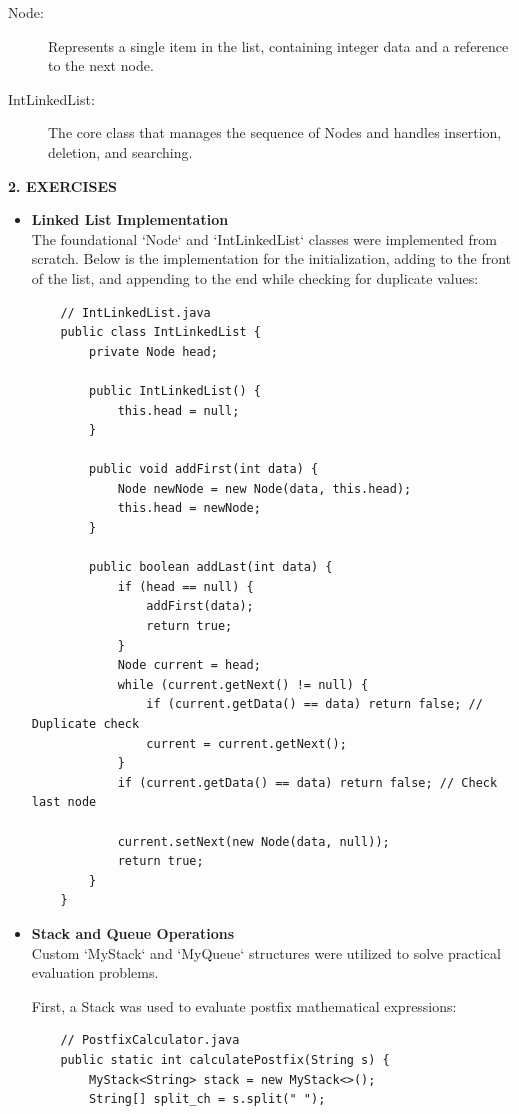 \documentclass[12pt]{article}
\begin{document}
\begin{description}
    \item[Node:] Represents a single item in the list, containing integer data and a reference to the next node.
    \item[IntLinkedList:] The core class that manages the sequence of Nodes and handles insertion, deletion, and searching.
\end{description}


\textbf{2. EXERCISES}
\begin{itemize}

\item[\textbf{Exercise 1. }] \textbf{Linked List Implementation} \\
The foundational `Node` and `IntLinkedList` classes were implemented from scratch. Below is the implementation for the initialization, adding to the front of the list, and appending to the end while checking for duplicate values:
\begin{verbatim}
    // IntLinkedList.java
    public class IntLinkedList {
        private Node head;

        public IntLinkedList() {
            this.head = null;
        }

        public void addFirst(int data) {
            Node newNode = new Node(data, this.head); 
            this.head = newNode;
        }
        
        public boolean addLast(int data) {
            if (head == null) {
                addFirst(data);
                return true;
            }
            Node current = head;
            while (current.getNext() != null) {
                if (current.getData() == data) return false; // Duplicate check
                current = current.getNext();
            }
            if (current.getData() == data) return false; // Check last node
            
            current.setNext(new Node(data, null));
            return true;
        }
    }
\end{verbatim}

\item[\textbf{Exercise 2. }] \textbf{Stack and Queue Operations} \\
Custom `MyStack` and `MyQueue` structures were utilized to solve practical evaluation problems. 

First, a Stack was used to evaluate postfix mathematical expressions:
\begin{verbatim}
    // PostfixCalculator.java
    public static int calculatePostfix(String s) {
        MyStack<String> stack = new MyStack<>();
        String[] split_ch = s.split(" "); 
        

\end{verbatim}
\end{itemize}
\end{document}
